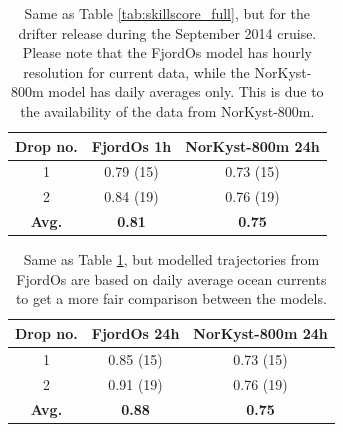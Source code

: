 \begin{table}
\begin{center}
  \begin{tabular}{ | c | c | c |}
    \hline
    {\bf Drop no.} & {\bf FjordOs 1h} & {\bf NorKyst-800m 24h} \\ \hline
    1 & 0.79 (15) & 0.73 (15) \\ 
    2 & 0.84 (19) & 0.76 (19) \\ \hline
    {\bf Avg.} & {\bf 0.81} & {\bf 0.75} \\
    \hline
  \end{tabular}
\caption{Same as Table \ref{tab:skillscore_full}, but for the drifter release during the September 2014 cruise. Please note that the FjordOs model has hourly resolution for current data, while the NorKyst-800m model has daily averages only. This is due to the availability of the data from NorKyst-800m.}
\label{tab:skillscore2014_1h}
\end{center}
\end{table}
\begin{table}
\begin{center}
  \begin{tabular}{ | c | c | c |}
    \hline
    {\bf Drop no.} & {\bf FjordOs 24h} & {\bf NorKyst-800m 24h} \\ \hline
    1 & 0.85 (15) & 0.73 (15) \\ 
    2 & 0.91 (19) & 0.76 (19) \\ \hline
    {\bf Avg.} & {\bf 0.88} & {\bf 0.75} \\
    \hline
  \end{tabular}
\caption{Same as Table \ref{tab:skillscore2014_1h}, but modelled trajectories from FjordOs are based on daily average ocean currents to get a more fair comparison between the models.}
\label{tab:skillscore2014_24h}
\end{center}
\end{table}



